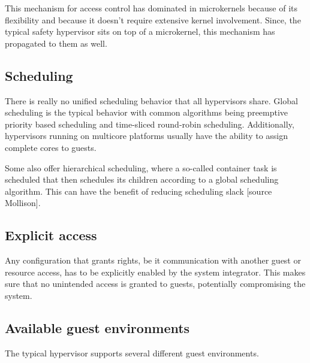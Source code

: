 This mechanism for access control has dominated in microkernels because of its flexibility and because it doesn't require extensive kernel involvement. Since, the typical safety hypervisor sits on top of a microkernel, this mechanism has propagated to them as well.

\subsection{Scheduling}
There is really no unified scheduling behavior that all hypervisors share. Global scheduling is the typical behavior with common algorithms being preemptive priority based scheduling and time-sliced round-robin scheduling. Additionally, hypervisors running on multicore platforms usually have the ability to assign complete cores to guests.

Some also offer hierarchical scheduling, where a so-called container task is scheduled that then schedules its children according to a global scheduling algorithm. This can have the benefit of reducing scheduling slack [source Mollison]. 

\begin{comment}
\subsection{Static configuration}
Any mechanism to increase a guests rights at runtime poses the risk of exploitation, be it accidental or purposeful. That is why these systems are typically statically configured and if configuration runtime is at all possible, it is restricted to reducing privilege. For example, a guest that is allowed to spawn other guests may give them his own rights or less than his own but never more.
\end{comment}

\subsection{Explicit access}
Any configuration that grants rights, be it communication with another guest or resource access, has to be explicitly enabled by the system integrator. This makes sure that no unintended access is granted to guests, potentially compromising the system.
\subsection{Available guest environments}
The typical hypervisor supports several different guest environments.
